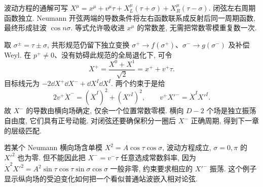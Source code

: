 波动方程的通解可写 $X^\mu=x^\mu+v^\mu\tau+X_L^\mu(\tau+\sigma)+X_R^\mu(\tau-\sigma)$. 闭弦左右周期函数独立. Neumann 开弦两端的导数条件将左右函数联系成反射后同一周期函数, 最终形成驻波 $\cos n\sigma$. 等式允许吸收进 $x^\mu$ 的常数差, 无需把常数零模重复数一次.

取 $\sigma^\pm=\tau\pm\sigma$, 共形规范仍留下独立变换 $\sigma^+\to f(\sigma^+)$、$\sigma^-\to g(\sigma^-)$ 及补偿 Weyl. 在 $p^+\ne0$、没有妨碍此规范的全局退化下, 可令
\[
X^+=\frac{X^0+X^1}{\sqrt2}=x^++v^+\tau.
\]
目标线元为 $-2\dd X^+\dd X^-+\dd X^I\dd X^I$. 两个约束于是给
\[
2v^+\dot X^-=(\dot X^I)^2+(X'^I)^2,
\qquad v^+X'^- =\dot X^I X'^I.
\]
故 $X^-$ 的导数由横向场确定, 仅余一个位置常数零模. 横向 $D-2$ 个场是独立振荡自由度, 它们具有正号动能. 对闭弦还要确保积分一圈后 $X^-$ 正确周期, 得到下一章的层级匹配.

\begin{example}
若某个 Neumann 横向场含单模 $X^2=A\cos\tau\cos\sigma$, 波动方程成立, $\sigma=0,\pi$ 的 $X'^2$ 也为零. 但不能因此把 $X^-=v^-\tau$ 任意选成常数斜率, 因为 $\dot X^2X'^2=A^2\sin\tau\cos\tau\sin\sigma\cos\sigma$ 一般非零, 约束要求相应的 $X'^-$ 振荡. 这个例子显示纵向场的受迫变化如何把一个看似普通站波嵌入相对论弦.
\end{example}
